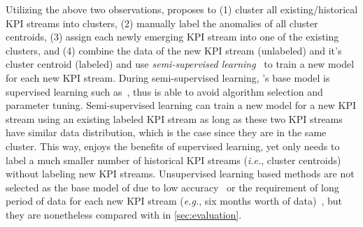 Utilizing the above two observations, \name{} proposes to (1) cluster all existing/historical KPI streams into clusters, (2) manually label the anomalies of all cluster centroids, (3) assign each newly emerging KPI stream into one of the existing clusters, and (4) combine the data of the new KPI stream (unlabeled) and it's cluster centroid (labeled) and use \emph{semi-supervised learning}~\cite{chapelle2009semi} to train a new model for each new KPI stream. During semi-supervised learning, \name{}'s base model is supervised learning such as~\cite{liu2015opprentice}, thus is able to avoid algorithm selection and parameter tuning. Semi-supervised learning can train a new model for a new KPI stream using an existing labeled KPI stream as long as these two KPI streams have similar data distribution, which is the case since they are in the same cluster. This way, \name{} enjoys the benefits of supervised learning, yet only needs to label a much smaller number of historical KPI streams (\textit{i.e.}, cluster centroids) without labeling new KPI streams. Unsupervised learning based methods are not selected as the base model of \name{} due to low accuracy~\cite{zhang2018anomaly} or the requirement of long period of data for each new KPI stream (\textit{e.g.}, six months worth of data)~\cite{xu2018unsupervised}, but they are nonetheless compared with \name{} in \cref{sec:evaluation}. 






